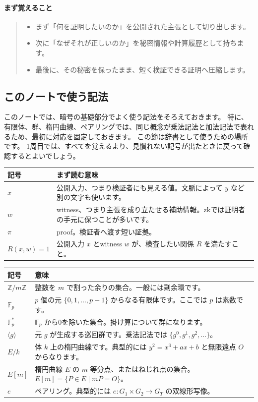 \documentclass[a4paper,11pt]{ltjsarticle}
\newcommand{\F}{\mathbb{F}}
\newcommand{\Z}{\mathbb{Z}}
\newenvironment{keybox}{%
  \paragraph*{まず覚えること}\begin{quote}
}{%
  \end{quote}
}
\begin{document}
\begin{keybox}
\begin{itemize}
  \item まず「何を証明したいのか」を公開された主張として切り出します。
  \item 次に「なぜそれが正しいのか」を秘密情報や計算履歴として持ちます。
  \item 最後に、その秘密を保ったまま、短く検証できる証明へ圧縮します。
\end{itemize}
\end{keybox}

\subsection{このノートで使う記法}

このノートでは、暗号の基礎部分でよく使う記法をそろえておきます。
特に、有限体、群、楕円曲線、ペアリングでは、同じ概念が乗法記法と加法記法で表れるため、最初に対応を固定しておきます。
この節は辞書として使うための場所です。
1周目では、すべてを覚えるより、見慣れない記号が出たときに戻って確認するとよいでしょう。

\begin{center}
\begin{tabularx}{\linewidth}{@{}lY@{}}
\toprule
記号 & まず読む意味 \\
\midrule
\(x\) & 公開入力、つまり検証者にも見える値。文脈によって \(y\) など別の文字も使います。 \\
\(w\) & witness、つまり主張を成り立たせる補助情報。zkでは証明者の手元に保つことが多いです。 \\
\(\pi\) & proof。検証者へ渡す短い証拠。 \\
\(R(x,w)=1\) & 公開入力 \(x\) とwitness \(w\) が、検査したい関係 \(R\) を満たすこと。 \\
\bottomrule
\end{tabularx}
\end{center}

\begin{center}
\begin{tabularx}{\linewidth}{@{}lY@{}}
\toprule
記号 & 意味 \\
\midrule
\(\Z/m\Z\) & 整数を \(m\) で割った余りの集合。一般には剰余環です。 \\
\(\F_p\) & \(p\) 個の元 \(\{0,1,\ldots,p-1\}\) からなる有限体です。ここでは \(p\) は素数です。 \\
\(\F_p^\ast\) & \(\F_p\) から0を除いた集合。掛け算について群になります。 \\
\(\langle g\rangle\) & 元 \(g\) が生成する巡回群です。乗法記法では \(\{g^0,g^1,g^2,\ldots\}\)。 \\
\(E/k\) & 体 \(k\) 上の楕円曲線です。典型的には \(y^2=x^3+ax+b\) と無限遠点 \(O\) からなります。 \\
\(E[m]\) & 楕円曲線 \(E\) の \(m\) 等分点、またはねじれ点の集合。\(E[m]=\{P\in E\mid mP=O\}\)。 \\
\(e\) & ペアリング。典型的には \(e:G_1\times G_2\to G_T\) の双線形写像。 \\
\bottomrule
\end{tabularx}
\end{center}
\end{document}
